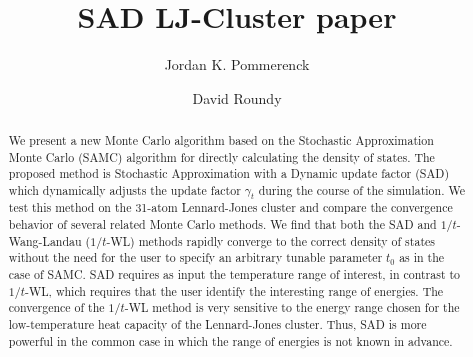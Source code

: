 \documentclass[letterpaper,twocolumn,amsmath,amssymb,pre,aps,10pt]{revtex4-1}
\begin{document}
\title{SAD LJ-Cluster paper
}

\author{Jordan K. Pommerenck} \author{David Roundy}

\begin{abstract}
  We present a new Monte Carlo algorithm based on the Stochastic
  Approximation Monte Carlo (SAMC) algorithm for directly calculating
  the density of states. The proposed method is Stochastic
  Approximation with a Dynamic update factor (SAD)
  which dynamically adjusts the update factor $\gamma_t$ during the course of
  the simulation. We test this method on the 31-atom Lennard-Jones cluster and
  compare the convergence behavior of several
  related
  Monte Carlo methods. We find that both the SAD and $1/t$-Wang-Landau ($1/t$-WL)
  methods rapidly converge to the
  correct density of states without the need for the user to specify an
  arbitrary tunable parameter $t_0$ as in the case of SAMC.  SAD requires
  as input the temperature range of interest, in contrast to
  $1/t$-WL, which requires that the user identify the interesting range
  of energies.
  The convergence of the $1/t$-WL method is very sensitive to the energy
  range chosen for the low-temperature heat capacity of the
  Lennard-Jones cluster.
  Thus, SAD is more powerful in the common case in which the range
  of energies is not known in advance.
\end{abstract}

\maketitle
\end{document}
